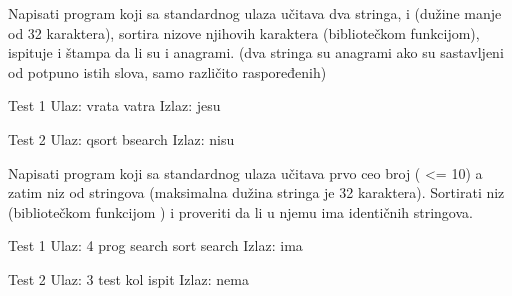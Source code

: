 \begin{Exercise}[label=513]
  Napisati program koji sa standardnog ulaza učitava dva stringa,
   i  (dužine manje od 32 karaktera), sortira nizove
  njihovih karaktera (bibliotečkom  funkcijom), ispituje
  i štampa da li su  i  anagrami. (dva stringa su
  anagrami ako su sastavljeni od potpuno istih slova, samo različito
  raspoređenih)
  
\begin{minitest}
\begin{test}{Test 1}
Ulaz:   vrata vatra
Izlaz:  jesu
\end{test}
\end{minitest}
\begin{miditest}
\begin{test}{Test 2}
Ulaz:   qsort bsearch
Izlaz:  nisu
\end{test}
\end{miditest}
  
\end{Exercise}

\begin{Exercise}[label=514]
  Napisati program koji sa standardnog ulaza učitava prvo ceo broj
   ( <= 10) a zatim niz  od  stringova
  (maksimalna dužina stringa je 32 karaktera). Sortirati niz 
  (bibliotečkom funkcijom ) i proveriti da li u njemu ima
  identičnih stringova.
  
\begin{miditest}
\begin{test}{Test 1}
Ulaz:   4 prog search sort search
Izlaz:  ima
\end{test}
\end{miditest}
\begin{miditest}
\begin{test}{Test 2}
Ulaz:   3 test kol ispit
Izlaz:  nema
\end{test}
\end{miditest}
  
\end{Exercise}


